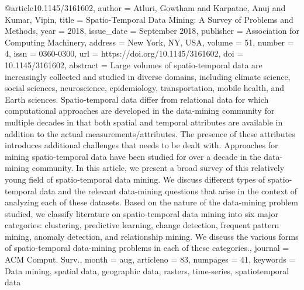 @article{10.1145/3161602,
author = {Atluri, Gowtham and Karpatne, Anuj and Kumar, Vipin},
title = {Spatio-Temporal Data Mining: A Survey of Problems and Methods},
year = {2018},
issue_date = {September 2018},
publisher = {Association for Computing Machinery},
address = {New York, NY, USA},
volume = {51},
number = {4},
issn = {0360-0300},
url = {https://doi.org/10.1145/3161602},
doi = {10.1145/3161602},
abstract = {Large volumes of spatio-temporal data are increasingly collected and studied in diverse domains, including climate science, social sciences, neuroscience, epidemiology, transportation, mobile health, and Earth sciences. Spatio-temporal data differ from relational data for which computational approaches are developed in the data-mining community for multiple decades in that both spatial and temporal attributes are available in addition to the actual measurements/attributes. The presence of these attributes introduces additional challenges that needs to be dealt with. Approaches for mining spatio-temporal data have been studied for over a decade in the data-mining community. In this article, we present a broad survey of this relatively young field of spatio-temporal data mining. We discuss different types of spatio-temporal data and the relevant data-mining questions that arise in the context of analyzing each of these datasets. Based on the nature of the data-mining problem studied, we classify literature on spatio-temporal data mining into six major categories: clustering, predictive learning, change detection, frequent pattern mining, anomaly detection, and relationship mining. We discuss the various forms of spatio-temporal data-mining problems in each of these categories.},
journal = {ACM Comput. Surv.},
month = aug,
articleno = {83},
numpages = {41},
keywords = {Data mining, spatial data, geographic data, rasters, time-series, spatiotemporal data}
}
